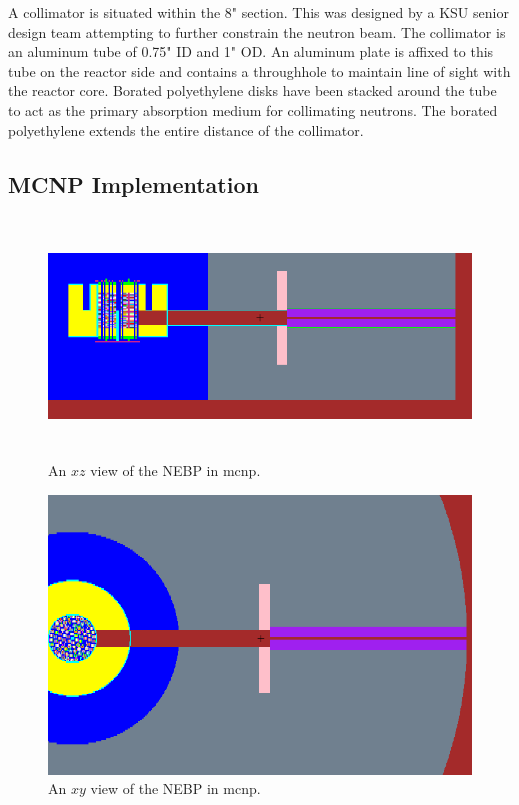 A collimator is situated within the 8" section.
This was designed by a KSU senior design team attempting to further constrain the neutron beam.
The collimator is an aluminum tube of 0.75" ID and 1" OD.
An aluminum plate is affixed to this tube on the reactor side and contains a throughhole to maintain line of sight with the reactor core.
Borated polyethylene disks have been stacked around the tube to act as the primary absorption medium for collimating neutrons.
The borated polyethylene extends the entire distance of the collimator. 


\subsection{MCNP Implementation}

\begin{figure}[htb]
\centering
\includegraphics[height=2.5in]{tex/figures/mcnp_newxz.png}
\caption[MCNP NEBP $XZ$]{An $xz$ view of the NEBP in mcnp.}
\label{fig:mcnp_newxz}
\end{figure}

\begin{figure}[htb]
\centering
\includegraphics[width=1\textwidth]{tex/figures/mcnp_newxy.png}
\caption[MCNP NEBP $XY$]{An $xy$ view of the NEBP in mcnp.}
\label{fig:mcnp_newxy}
\end{figure}



